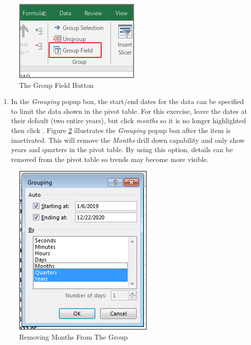 \begin{figure}[H]
	\centering
	\includegraphics[width=\maxwidth{.50\linewidth}]{gfx/ch07_fig23}
	\caption{The Group Field Button}
	\label{07:fig23}
\end{figure}

\begin{enumerate}[resume]
	\item In the \textit{Grouping} popup box, the start/end dates for the data can be specified to limit the data shown in the pivot table. For this exercise, leave the dates at their default (two entire years), but click \textit{months} so it is no longer highlighted then click . Figure \ref{07:fig24} illustrates the \textit{Grouping} popup box after the  item is inactivated. This will remove the \textit{Months} drill down capability and only show years and quarters in the pivot table. By using this option, details can be removed from the pivot table so trends may become more visible.
\end{enumerate}

\begin{figure}[H]
	\centering
	\includegraphics[width=\maxwidth{.60\linewidth}]{gfx/ch07_fig24}
	\caption{Removing Months From The Group}
	\label{07:fig24}
\end{figure}

